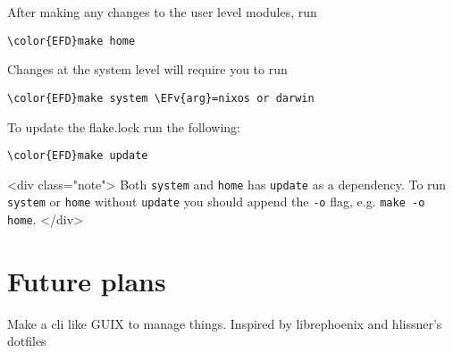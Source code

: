 \documentclass[11pt]{article}
\newcommand{\EFv}[1]{\textcolor{EFv}{\textbf{#1}}} %
\begin{document}
After making any changes to the user level modules, run
\begin{Code}
\begin{Verbatim}
\color{EFD}make home
\end{Verbatim}
\end{Code}

Changes at the system level will require you to run
\begin{Code}
\begin{Verbatim}
\color{EFD}make system \EFv{arg}=nixos or darwin
\end{Verbatim}
\end{Code}

To update the flake.lock run the following:
\begin{Code}
\begin{Verbatim}
\color{EFD}make update
\end{Verbatim}
\end{Code}

\begin{HTML}
<div class="note">
Both \texttt{system} and \texttt{home} has \texttt{update} as a dependency. To run \texttt{system} or \texttt{home}
without \texttt{update} you should append the \texttt{-o} flag, e.g. \texttt{make -o home}. 
</div>
\end{HTML}
\section{Future plans}
\label{sec:org009df0e}
Make a cli like GUIX to manage things. Inspired by librephoenix and hlissner's dotfiles
\end{document}
